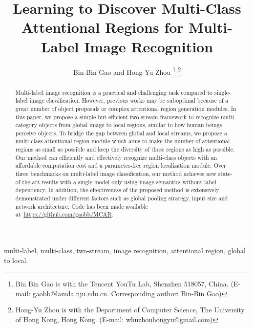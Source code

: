 \documentclass[journal]{IEEEtran}
\begin{document}
\title{Learning to Discover Multi-Class Attentional Regions for Multi-Label Image Recognition}
\author{Bin-Bin Gao and Hong-Yu Zhou
\thanks{Bin Bin Gao is with the Tencent YouTu Lab,  Shenzhen 518057, China. (E-mail: {gaobb}@lamda.nju.edu.cn. Corresponding author: Bin-Bin Gao)}
\thanks{Hong-Yu Zhou is with the Department of Computer Science, The University of Hong Kong, Hong Kong. (E-mail: whuzhouhongyu@gmail.com)}
}


\maketitle

\begin{abstract}
Multi-label image recognition is a practical and challenging task compared to single-label image classification. However, previous works may be suboptimal because of a great number of object proposals or complex attentional region generation modules. In this paper, we propose a simple but efficient two-stream framework to recognize multi-category objects from global image to local regions, similar to how human beings perceive objects. To bridge the gap between global and local streams, we propose a multi-class attentional region module which aims to make the number of attentional regions as small as possible and keep the diversity of these regions as high as possible. Our method can efficiently and effectively recognize multi-class objects with an affordable computation cost and a parameter-free region localization module. Over three benchmarks on multi-label image classification, our method achieves new state-of-the-art results with a single model only using image semantics without label dependency. In addition, the effectiveness of the proposed method is extensively demonstrated under different factors such as global pooling strategy, input size and network architecture. Code has been made available at~\url{https://github.com/gaobb/MCAR}.
\end{abstract}

\begin{IEEEkeywords}
multi-label, multi-class, two-stream, image recognition, attentional region, global to local.
\end{IEEEkeywords}
\IEEEpeerreviewmaketitle
\end{document}
